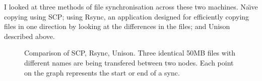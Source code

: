 \documentclass[12pt]{article}
\begin{document}
I looked at three methods of file synchronisation across
these two machines. Na\"{\i}ve copying using SCP; using Rsync, an application
designed for efficiently copying files in one direction by looking at
the differences in the files; and Unison described above.

\begin{figure}[htp]
    \caption{Comparison of SCP, Rsync, Unison. Three identical 50MB files 
    with different names are being transfered between two nodes. Each
    point on the graph represents the start or end of a sync.}
    \label{fig:point_comp_graph}
\end{figure}
\end{document}
